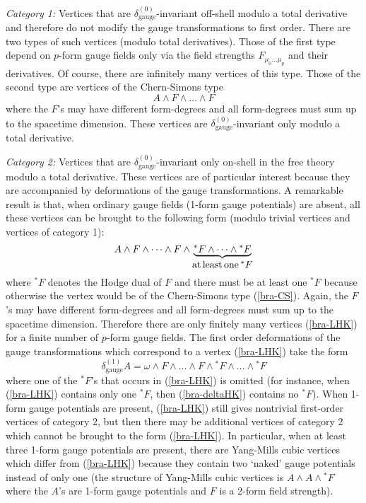 \documentclass[a4paper,12pt]{article}
\begin{document}
{\em Category 1:} Vertices that are 
$\delta_\mathrm{gauge}^{(0)}$-invariant off-shell
modulo a total derivative and therefore
do not modify the gauge transformations to first order. 
There are
two types of such vertices (modulo total derivatives). 
Those of the first type 
depend on $p$-form gauge fields only via
the field strengths $F_{\mu_0\dots\mu_p}$ and their derivatives.
Of course, there are infinitely many vertices of this type.
Those of the second type are vertices of the
Chern-Simons type
\begin{equation}
A\wedge F\wedge\dots\wedge F
\label{bra-CS}
\end{equation}
where the $F$'s may have different form-degrees
and all form-degrees must sum up to the spacetime dimension.
These vertices are $\delta_\mathrm{gauge}^{(0)}$-invariant only modulo a
total derivative.

{\em Category 2:}
Vertices that are $\delta_\mathrm{gauge}^{(0)}$-invariant
only on-shell in the free theory modulo a total derivative. 
These vertices are of particular
interest because they are accompanied by deformations
of the gauge transformations.
A remarkable result is that, when ordinary
gauge fields (1-form gauge potentials) are absent, all these
vertices can be brought to the following form (modulo
trivial vertices and vertices of category 1):
\begin{equation}
A\wedge F\wedge\dots\wedge F\wedge 
\underbrace{{^*F}\wedge\dots\wedge{^*F}}_{\mbox{at\,least\,one\,${^*F}$}}
\label{bra-LHK}
\end{equation}
where ${^*F}$ denotes the Hodge dual of $F$ and there must be
at least one ${^*F}$ because otherwise the vertex would be
of the Chern-Simons type (\ref{bra-CS}).
Again, the $F$'s may have different form-degrees
and all form-degrees must sum up to the spacetime dimension.
Therefore there are only finitely many vertices (\ref{bra-LHK})
for a finite number of $p$-form gauge fields. The first order
deformations of the gauge transformations
which correspond to a vertex (\ref{bra-LHK}) take the
form
\begin{equation}
\delta_\mathrm{gauge}^{(1)} A
=\omega\wedge F\wedge\dots\wedge F\wedge 
{^*F}\wedge\dots\wedge{^*F}
\label{bra-deltaHK}
\end{equation} 
where one of the $^*F$'s that occurs in
(\ref{bra-LHK}) is omitted (for instance, when (\ref{bra-LHK}) contains
only one $^*F$, then (\ref{bra-deltaHK}) contains no $^*F$).
When 1-form gauge potentials are present, (\ref{bra-LHK})
still gives nontrivial first-order vertices of category 2, but
then there may be additional
vertices of category 2 which cannot be brought to the form
(\ref{bra-LHK}). In particular,
when at least three 1-form gauge potentials are present, there are
Yang-Mills cubic vertices which differ
from (\ref{bra-LHK}) because they contain two `naked' gauge potentials
instead of only one (the structure of
Yang-Mills cubic vertices
is $A\wedge A\wedge {^*F}$ where the $A$'s are
1-form gauge potentials and $F$ is a 2-form field strength).
\end{document}
